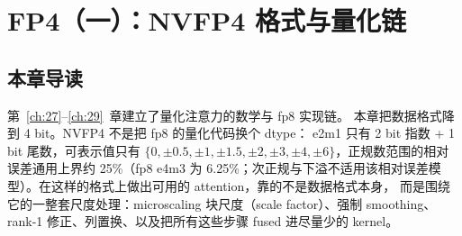 \chapter{FP4（一）：NVFP4 格式与量化链}\label{ch:31}

\section{本章导读}

第~\ref{ch:27}--\ref{ch:29}~章建立了量化注意力的数学与 fp8 实现链。
本章把数据格式降到 4 bit。NVFP4 不是把 fp8 的量化代码换个 dtype：
e2m1 只有 2 bit 指数 + 1 bit 尾数，可表示值只有
$\{0,\pm0.5,\pm1,\pm1.5,\pm2,\pm3,\pm4,\pm6\}$，正规数范围的相对误差通用上界约
25\%（fp8 e4m3 为 6.25\%；次正规与下溢不适用该相对误差模型）。在这样的格式上做出可用的 attention，靠的不是数据格式本身，
而是围绕它的一整套尺度处理：microscaling 块尺度（scale
factor）、强制 smoothing、rank-1 修正、列置换、以及把所有这些步骤
fused 进尽量少的 kernel。
